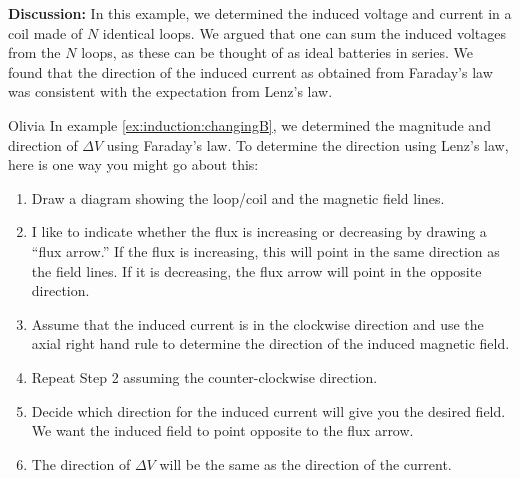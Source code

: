 \begin{example}
\textbf{Discussion: }In this example, we determined the induced voltage and current in a coil made of $N$ identical loops. We argued that one can sum the induced voltages from the $N$ loops, as these can be thought of as ideal batteries in series. We found that the direction of the induced current as obtained from Faraday's law was consistent with the expectation from Lenz's law.
\end{example}

\begin{studentOpinion}{Olivia}
In example \ref{ex:induction:changingB}, we determined the magnitude and direction of $\Delta V$ using Faraday's law. To determine the direction using Lenz's law, here is one way you might go about this:
\begin{enumerate}
\item  Draw a diagram showing the loop/coil and the magnetic field lines. 
\item I like to indicate whether the flux is increasing or decreasing by drawing a ``flux arrow.'' If the flux is increasing, this will point in the same direction as the field lines. If it is decreasing, the flux arrow will point in the opposite direction. 
\item Assume that the induced current is in the clockwise direction and use the axial right hand rule to determine the direction of the induced magnetic field. 
\item Repeat Step 2 assuming the counter-clockwise direction.
\item Decide which direction for the induced current will give you the desired field. We want the induced field to point opposite to the flux arrow. 
\item The direction of $\Delta V$ will be the same as the direction of the current. 
\end{enumerate}  


\end{studentOpinion}
